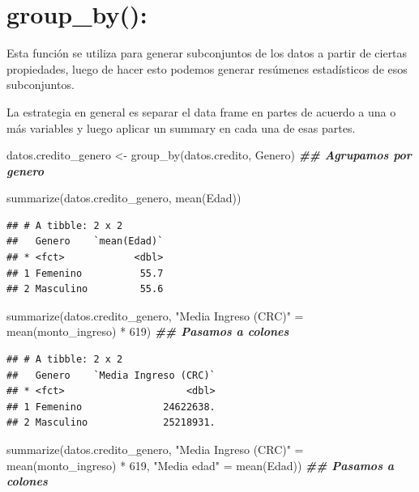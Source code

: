 \documentclass[
  12pt,
]{book}
\newenvironment{Shaded}{\begin{snugshade}}{\end{snugshade}}
\newcommand{\DecValTok}[1]{\textcolor[rgb]{0.00,0.00,0.81}{#1}}
\newcommand{\DocumentationTok}[1]{\textcolor[rgb]{0.56,0.35,0.01}{\textbf{\textit{#1}}}}
\newcommand{\FunctionTok}[1]{\textcolor[rgb]{0.00,0.00,0.00}{#1}}
\newcommand{\NormalTok}[1]{#1}
\newcommand{\OtherTok}[1]{\textcolor[rgb]{0.56,0.35,0.01}{#1}}
\newcommand{\SpecialCharTok}[1]{\textcolor[rgb]{0.00,0.00,0.00}{#1}}
\newcommand{\StringTok}[1]{\textcolor[rgb]{0.31,0.60,0.02}{#1}}
\begin{document}
\hypertarget{group_by}{%
\section{\texorpdfstring{\textbf{group\_by()}:}{group\_by():}}\label{group_by}}

Esta función se utiliza para generar subconjuntos de los datos a partir de ciertas propiedades, luego de hacer esto podemos generar resúmenes estadísticos de esos subconjuntos.

La estrategia en general es separar el data frame en partes de acuerdo a una o más variables y luego aplicar un summary en cada una de esas partes.

\begin{Shaded}
\begin{Highlighting}[]
\NormalTok{datos.credito\_genero }\OtherTok{\textless{}{-}} \FunctionTok{group\_by}\NormalTok{(datos.credito, Genero) }\DocumentationTok{\#\# Agrupamos por genero}

\FunctionTok{summarize}\NormalTok{(datos.credito\_genero, }\FunctionTok{mean}\NormalTok{(Edad))}
\end{Highlighting}
\end{Shaded}

\begin{verbatim}
## # A tibble: 2 x 2
##   Genero    `mean(Edad)`
## * <fct>            <dbl>
## 1 Femenino          55.7
## 2 Masculino         55.6
\end{verbatim}

\begin{Shaded}
\begin{Highlighting}[]
\FunctionTok{summarize}\NormalTok{(datos.credito\_genero, }\StringTok{"Media Ingreso (CRC)"} \OtherTok{=} \FunctionTok{mean}\NormalTok{(monto\_ingreso) }\SpecialCharTok{*} \DecValTok{619}\NormalTok{) }\DocumentationTok{\#\# Pasamos a colones}
\end{Highlighting}
\end{Shaded}

\begin{verbatim}
## # A tibble: 2 x 2
##   Genero    `Media Ingreso (CRC)`
## * <fct>                     <dbl>
## 1 Femenino              24622638.
## 2 Masculino             25218931.
\end{verbatim}

\begin{Shaded}
\begin{Highlighting}[]
\FunctionTok{summarize}\NormalTok{(datos.credito\_genero, }\StringTok{"Media Ingreso (CRC)"} \OtherTok{=} \FunctionTok{mean}\NormalTok{(monto\_ingreso) }\SpecialCharTok{*} \DecValTok{619}\NormalTok{, }\StringTok{"Media edad"} \OtherTok{=} \FunctionTok{mean}\NormalTok{(Edad)) }\DocumentationTok{\#\# Pasamos a colones}
\end{Highlighting}
\end{Shaded}
\end{document}
